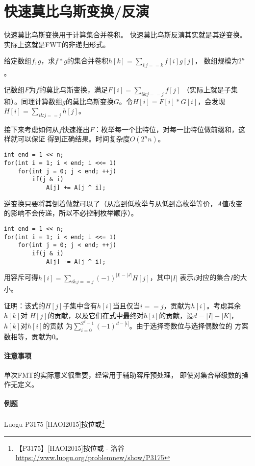 \section{快速莫比乌斯变换/反演}\label{FMT}
快速莫比乌斯变换用于计算集合并卷积。
快速莫比乌斯反演其实就是其逆变换。
实际上这就是FWT的非递归形式。

给定数组$f,g$，求$f*g$的集合并卷积$\displaystyle h[k]=\sum_{i|j==k}{f[i]g[j]}$，
数组规模为$2^n$。

记数组$F$为$f$的莫比乌斯变换，满足$\displaystyle F[i]=\sum_{i\&j==j}{f[j]}$
（实际上就是子集和）。同理计算数组$g$的莫比乌斯变换$G$。令$H[i]=F[i]*G[i]$，会发现
$\displaystyle H[i]=\sum_{i\&j==j}{h[j]}$。

接下来考虑如何从$f$快速推出$F$：枚举每一个比特位，对每一比特位做前缀和，这样就可以保证
得到正确结果。时间复杂度$O(2^nn)$。
\begin{lstlisting}
int end = 1 << n;
for(int i = 1; i < end; i <<= 1)
    for(int j = 0; j < end; ++j)
        if(j & i)
            A[j] += A[j ^ i];
\end{lstlisting}

逆变换只要将其倒着做就可以了（从高到低枚举与从低到高枚举等价，$A$值改变
的影响不会传递，所以不必控制枚举顺序）。
\begin{lstlisting}
int end = 1 << n;
for(int i = 1; i < end; i <<= 1)
    for(int j = 0; j < end; ++j)
        if(j & i)
            A[j] -= A[j ^ i];
\end{lstlisting}

用容斥可得$\displaystyle h[i]=\sum_{i\&j==j}{(-1)^{|I|-|J|}H[j]}$，其中$|I|$
表示$i$对应的集合$I$的大小。

证明：该式的$H[j]$子集中含有$h[i]$当且仅当$i==j$，贡献为$h[i]$。考虑其余$h[k]$对
$H[j]$的贡献，以及它们在式中最终对$h[i]$的贡献，设$d=|I|-|K|$，$h[k]$对$h[i]$的贡献
为$\displaystyle \sum_{i=0}^{2^d-1}{(-1)^{d-|i|}}$。由于选择奇数位与选择偶数位的
方案数相等，贡献为0。

\paragraph{注意事项} 单次FMT的实际意义很重要，经常用于辅助容斥预处理，
即使对集合幂级数的操作无定义。

\paragraph{例题}
Luogu P3175 [HAOI2015]按位或\footnote{
    【P3175】[HAOI2015]按位或 - 洛谷
    \url{https://www.luogu.org/problemnew/show/P3175}
}

